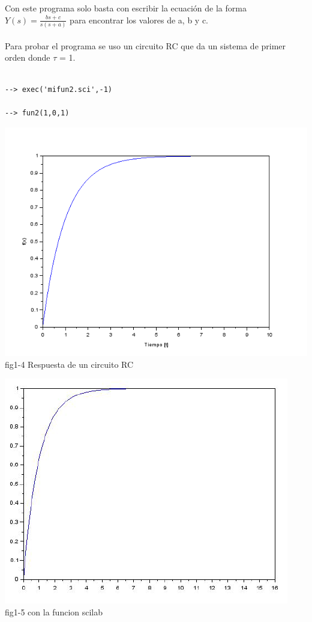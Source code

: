 \documentclass[12pt,a4paper]{IEEEtran}
\begin{document}
Con este programa solo basta con escribir la ecuación de la forma $Y(s) = \frac{bs + c}{s(s + a)}$ para encontrar los valores de a, b y c. \\ \\
Para probar el programa se uso un circuito RC que da un sistema de primer orden donde $\tau$ = 1. 

\begin{verbatim}

--> exec('mifun2.sci',-1)

--> fun2(1,0,1)

\end{verbatim}


\begin{center}
	\includegraphics[scale = 0.4]{images/GRAF}\\
	{fig1-4 Respuesta de un circuito RC}
\end{center}

\begin{center}
	\includegraphics[scale = 0.6]{images/funcionscilab}\\
	{fig1-5 con la funcion scilab}
\end{center}
\end{document}
